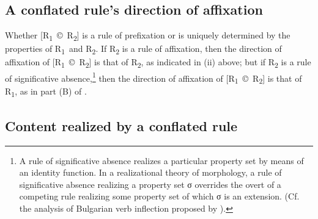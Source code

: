 \documentclass[output=paper,
modfonts
]{LSP/langsci}
\begin{document}
\subsection{A conflated rule’s direction of affixation}

Whether [R\textsubscript{1}~©~R\textsubscript{2}] is a rule of prefixation or  is uniquely determined by the properties of R\textsubscript{1}~and R\textsubscript{2}.  If R\textsubscript{2} is a rule of affixation, then the direction of affixation of [R\textsubscript{1}~©~R\textsubscript{2}] is that of R\textsubscript{2}, as indicated in (ii) above; but if R\textsubscript{2} is a rule of significative absence,\footnote{A rule of significative absence realizes a particular property set by means of an identity function.  In a realizational theory of morphology, a rule of significative absence realizing a property set σ overrides the overt  of a competing rule realizing some property set of which σ is an extension.  (Cf. the analysis of Bulgarian verb inflection proposed by \citealt[441ff]{Stump2001}).}  then the direction of affixation of [R\textsubscript{1}~©~R\textsubscript{2}] is that of R\textsubscript{1}, as in part (B) of .

\subsection{Content realized by a conflated rule}\label{sec:stump:4.4}
\end{document}
